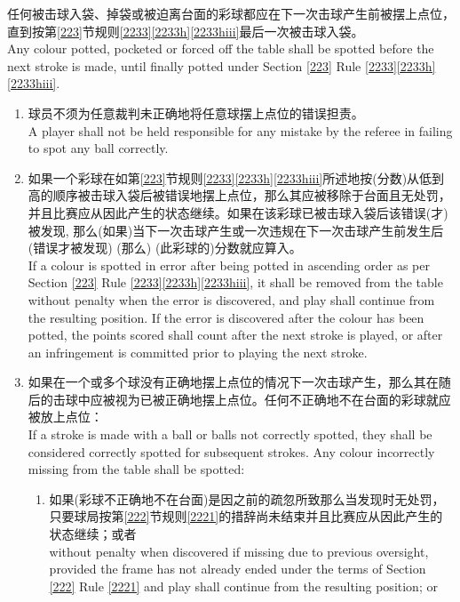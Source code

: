 \noindent 任何被击球入袋、掉袋或被迫离台面的彩球都应在下一次击球产生前被摆上点位，直到按第\ref{223}节规则\ref{2233}\ref{2233h}\ref{2233hiii}最后一次被击球入袋。\\
Any colour potted, pocketed or forced off the table shall be spotted before the next stroke is made, until finally potted under Section \ref{223} Rule \ref{2233}\ref{2233h}\ref{2233hiii}.
\begin{enumerate}[label=(\alph*)]
    \item 球员不须为任意裁判未正确地将任意球摆上点位的错误担责。\\
    A player shall not be held responsible for any mistake by the referee in failing to spot any ball correctly.
    \item 如果一个彩球在如第\ref{223}节规则\ref{2233}\ref{2233h}\ref{2233hiii}所述地按(分数)从低到高的顺序被击球入袋后被错误地摆上点位，那么其应被移除于台面且无处罚，并且比赛应从因此产生的状态继续。如果在该彩球已被击球入袋后该错误(才)被发现, 那么(如果)当下一次击球产生或一次违规在下一次击球产生前发生后(错误才被发现) (那么) (此彩球的)分数就应算入。\\
    If a colour is spotted in error after being potted in ascending order as per Section \ref{223} Rule \ref{2233}\ref{2233h}\ref{2233hiii}, it shall be removed from the table without penalty when the error is discovered, and play shall continue from the resulting position. If the error is discovered after the colour has been potted, the points scored shall count after the next stroke is played, or after an infringement is committed prior to playing the next stroke.
    \item \label{2237c}如果在一个或多个球没有正确地摆上点位的情况下一次击球产生，那么其在随后的击球中应被视为已被正确地摆上点位。任何不正确地不在台面的彩球就应被放上点位：\\
    If a stroke is made with a ball or balls not correctly spotted, they shall be considered correctly spotted for subsequent strokes. Any colour incorrectly missing from the table shall be spotted:
    \begin{enumerate}[label=(\roman*)]
        \item 如果(彩球不正确地不在台面)是因之前的疏忽所致那么当发现时无处罚，只要球局按第\ref{222}节规则\ref{2221}的措辞尚未结束并且比赛应从因此产生的状态继续；或者\\
        without penalty when discovered if missing due to previous oversight, provided the frame has not already ended under the terms of Section \ref{222} Rule \ref{2221} and play shall continue from the resulting position; or

\end{enumerate}
\end{enumerate}
